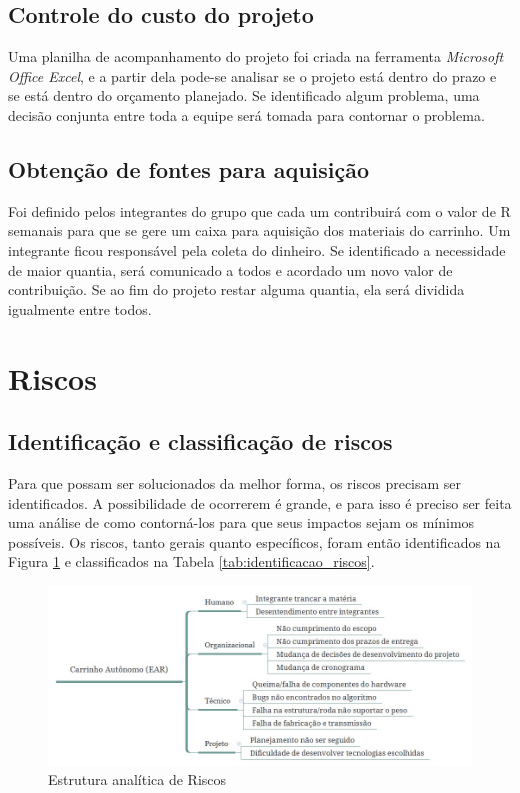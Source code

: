 \subsection{Controle do custo do projeto}

Uma planilha de acompanhamento do projeto foi criada na ferramenta \textit{Microsoft Office Excel}, e a partir dela pode-se analisar se o projeto está dentro do prazo e se está dentro do orçamento planejado. Se identificado algum problema, uma decisão conjunta entre toda a equipe será tomada para contornar o problema.

\subsection{Obtenção de fontes para aquisição}
Foi definido pelos integrantes do grupo que cada um contribuirá com o valor de R semanais para que se gere um caixa para aquisição dos materiais do carrinho. Um integrante ficou responsável pela coleta do dinheiro. Se identificado a necessidade de maior quantia, será comunicado a todos e acordado um novo valor de contribuição. Se ao fim do projeto restar alguma quantia, ela será dividida igualmente entre todos. 

\section{Riscos}

\subsection{Identificação e classificação de riscos}
Para que possam ser solucionados da melhor forma, os riscos precisam ser identificados. A possibilidade de ocorrerem é grande, e para isso é preciso ser feita uma análise de como contorná-los para que seus impactos sejam os mínimos possíveis. Os riscos, tanto gerais quanto específicos, foram então identificados na Figura \ref{fig:ear} e classificados na Tabela \ref{tab:identificacao_riscos}.

\begin{figure}[ht]
		\centering
		\includegraphics[width=.9\textwidth]{figuras/ear.jpg}
		\caption{Estrutura analítica de Riscos}
		\label{fig:ear}
	\end{figure}

